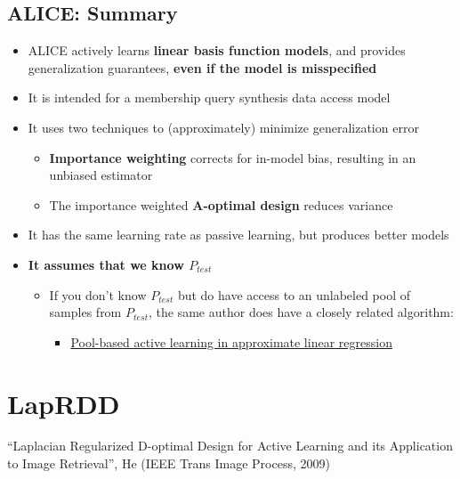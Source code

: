 \documentclass[10pt]{article}
\begin{document}
\subsection*{ALICE: Summary}
\begin{itemize}
	\item ALICE actively learns \textbf{linear basis function models}, and provides generalization guarantees, \textbf{even if the model is misspecified}
	\item It is intended for a membership query synthesis data access model
	\item It uses two techniques to (approximately) minimize generalization error
	\begin{itemize}
	    \item \textbf{Importance weighting} corrects for in-model bias, resulting in an unbiased estimator
	    \item The importance weighted \textbf{A-optimal design} reduces variance
    \end{itemize}
    \item It has the same learning rate as passive learning, but produces better models
    \item \textbf{It assumes that we know $P_{test}$}
    \begin{itemize}
	    \item If you don't know $P_{test}$ but do have access to an unlabeled pool of samples from $P_{test}$, the same author does have a closely related algorithm: 
        \begin{itemize}
	        \item \underline{Pool-based active learning in approximate linear regression}
        \end{itemize}
    \end{itemize}
\end{itemize}

\section*{LapRDD}
``Laplacian Regularized D-optimal Design for Active Learning and its Application to Image Retrieval'', He (IEEE Trans Image Process, 2009)
\end{document}
